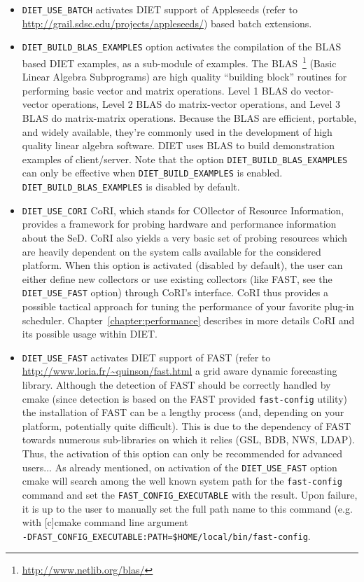 \begin{itemize}
\item
  \verb+DIET_USE_BATCH+ activates DIET support of Appleseeds (refer to
  \url{http://grail.sdsc.edu/projects/appleseeds/}) based batch
  extensions. 

\item
  \verb+DIET_BUILD_BLAS_EXAMPLES+ option activates the compilation of
  the BLAS based DIET examples, as a sub-module of examples.
  The BLAS~\footnote{\url{http://www.netlib.org/blas/}} (Basic Linear
  Algebra Subprograms) are high quality ``building block'' routines for
  performing basic vector and matrix operations.
  Level 1 BLAS do vector-vector operations, Level 2 BLAS do matrix-vector
  operations, and Level 3 BLAS do matrix-matrix operations.
  Because the BLAS are efficient, portable, and widely available,
  they're commonly used in the development of high quality linear algebra
  software.
  DIET uses BLAS to build demonstration examples of client/server.
  Note that the option \verb+DIET_BUILD_BLAS_EXAMPLES+ can only be
  effective when \verb+DIET_BUILD_EXAMPLES+ is enabled.
  \verb+DIET_BUILD_BLAS_EXAMPLES+ is disabled by default.

\item
  \verb+DIET_USE_CORI+ CoRI, which stands for COllector of Resource
  Information, provides a framework for probing hardware and performance
  information about the SeD.
  CoRI also yields a very basic set of probing resources which are
  heavily dependent on the system calls available for the considered platform.
  When this option is activated (disabled by default), the user can either
  define new collectors or use existing collectors (like FAST, see the
  \verb+DIET_USE_FAST+ option) through CoRI's interface.
  CoRI thus provides a possible tactical approach for tuning the performance
  of your favorite plug-in scheduler.
  Chapter~\ref{chapter:performance} describes in more details CoRI and its
  possible usage within DIET.

\item
  \verb+DIET_USE_FAST+ activates DIET support of FAST (refer to
  \url{http://www.loria.fr/~quinson/fast.html} a grid aware dynamic
  forecasting library.
  Although the detection of FAST should be correctly handled by cmake
  (since detection is based on the FAST provided \verb+fast-config+ utility)
  the installation of FAST can be a lengthy process (and, depending on your
  platform, potentially quite difficult).
  This is due to the dependency of FAST towards numerous sub-libraries on
  which it relies (GSL, BDB, NWS, LDAP).
  Thus, the activation of this option can only be recommended for advanced
  users...
  As already mentioned, on activation of the \verb+DIET_USE_FAST+ option
  cmake will search among the well known system path for the
  \verb+fast-config+ command and set the \verb+FAST_CONFIG_EXECUTABLE+ 
  with the result. Upon failure, it is up to the user to manually set the
  full path name to this command (e.g. with [c]cmake command line argument \\
  \verb+-DFAST_CONFIG_EXECUTABLE:PATH=$HOME/local/bin/fast-config+.


\end{itemize}

